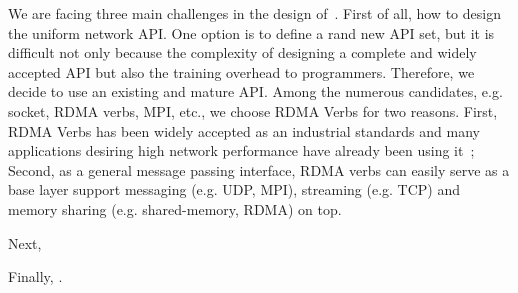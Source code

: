 We are facing three main challenges in the design of~\sysname. First of all, 
how to design the uniform network API. One option is to define a rand new API 
set, but it is difficult not only because the complexity of designing a complete
and widely accepted API but also the training overhead to programmers.
Therefore, we decide to use an existing and mature API. Among the numerous candidates, e.g. socket, RDMA verbs, MPI, etc., we choose RDMA Verbs for two
reasons. First, RDMA Verbs has been widely accepted as an industrial standards and many applications desiring high network performance have already been using it~\cite{?}; Second, as a general message passing interface, RDMA verbs can easily serve as a base layer support messaging (e.g. UDP,
MPI), streaming (e.g. TCP) and memory sharing (e.g. shared-memory, RDMA) on top.

Next, 

Finally, .